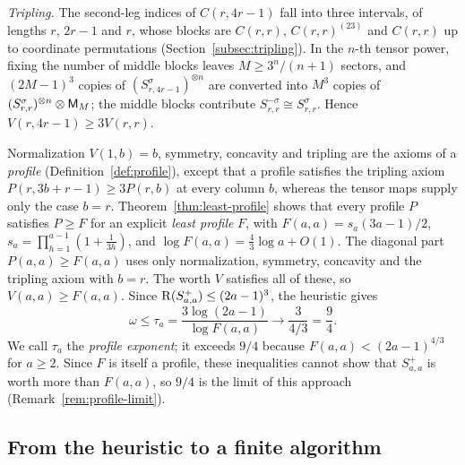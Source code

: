 \emph{Tripling.} The second-leg indices of \(C(r,4r-1)\) fall into three
intervals, of lengths \(r\), \(2r-1\) and \(r\), whose blocks are
\(C(r,r)\), \(C(r,r)^{(23)}\) and \(C(r,r)\) up to coordinate
permutations (Section~\ref{subsec:tripling}). In the \(n\)-th tensor
power, fixing the number of middle blocks leaves \(M\ge3^n/(n+1)\)
sectors, and \((2M-1)^3\) copies of \((S^\sigma_{r,4r-1})^{\otimes n}\)
are converted into \(M^3\) copies of
\((S^\sigma_{r,r})^{\otimes n}\otimes\mathsf M_M\); the middle blocks
contribute \(S^{-\sigma}_{r,r}\cong S^\sigma_{r,r}\). Hence
\(V(r,4r-1)\ge3V(r,r)\).

Normalization \(V(1,b)=b\), symmetry, concavity and tripling are the
axioms of a \emph{profile} (Definition~\ref{def:profile}), except that a
profile satisfies the tripling axiom \(P(r,3b+r-1)\ge3P(r,b)\) at every
column \(b\), whereas the tensor maps supply only the case \(b=r\).
Theorem~\ref{thm:least-profile} shows that every profile \(P\) satisfies
\(P\ge F\) for an explicit \emph{least profile} \(F\), with
\(F(a,a)=s_a(3a-1)/2\), \(s_a=\prod_{h=1}^{a-1}(1+\frac1{3h})\), and
\(\log F(a,a)=\frac43\log a+O(1)\). The diagonal part
\(P(a,a)\ge F(a,a)\) uses only normalization, symmetry, concavity and the
tripling axiom with \(b=r\). The worth \(V\) satisfies all of these, so
\(V(a,a)\ge F(a,a)\). Since \(\operatorname{R}(S^+_{a,a})\le(2a-1)^3\), the heuristic
gives
\[
 \omega\le\tau_a=\frac{3\log(2a-1)}{\log F(a,a)}
 \longrightarrow\frac{3}{4/3}=\frac94 .
\]
We call \(\tau_a\) the \emph{profile exponent}; it exceeds \(9/4\)
because \(F(a,a)<(2a-1)^{4/3}\) for \(a\ge2\). Since \(F\) is itself a
profile, these inequalities cannot show that \(S^+_{a,a}\) is worth more
than \(F(a,a)\), so \(9/4\) is the limit of this approach
(Remark~\ref{rem:profile-limit}).

\subsection{From the heuristic to a finite algorithm}
\label{subsec:intro-finite}


